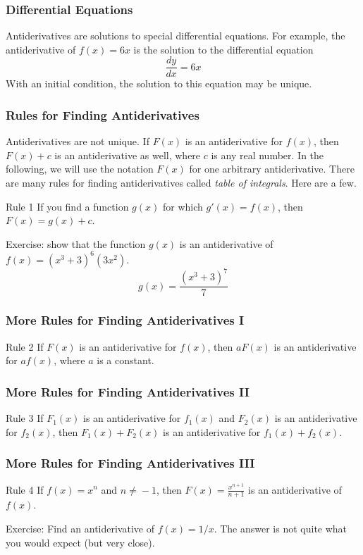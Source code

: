 \documentclass[xcolor=dvipsnames]{beamer}
\begin{document}
\begin{frame}
  \frametitle{Differential Equations}
Antiderivatives are solutions to special differential equations. For
example, the antiderivative of $f(x)=6x$ is the solution to the
differential equation
\begin{equation}
  \label{eq:xoozazui}
  \frac{dy}{dx}=6x
\end{equation}
With an initial condition, the solution to this equation may be
unique.
\end{frame}

\begin{frame}
  \frametitle{Rules for Finding Antiderivatives}
  Antiderivatives are not unique. If $F(x)$ is an antiderivative for
  $f(x)$, then $F(x)+c$ is an antiderivative as well, where $c$ is any
  real number. In the following, we will use the notation $F(x)$ for
  one arbitrary antiderivative. There are many rules for finding
  antiderivatives called \emph{table of integrals}. Here are a few.
  \begin{block}{Rule 1}
    If you find a function $g(x)$ for which $g'(x)=f(x)$, then
    $F(x)=g(x)+c$.
  \end{block}
  Exercise: show that the function $g(x)$ is an antiderivative of
  $f(x)=(x^{3}+3)^{6}(3x^{2})$.
  \begin{equation}
    \label{eq:eiyahcei}
    g(x)=\frac{(x^{3}+3)^{7}}{7}
  \end{equation}
\end{frame}

\begin{frame}
  \frametitle{More Rules for Finding Antiderivatives I}
  \begin{block}{Rule 2}
    If $F(x)$ is an antiderivative for $f(x)$, then $aF(x)$ is an
    antiderivative for $af(x)$, where $a$ is a constant.
  \end{block}
\end{frame}

\begin{frame}
  \frametitle{More Rules for Finding Antiderivatives II}
  \begin{block}{Rule 3}
    If $F_{1}(x)$ is an antiderivative for $f_{1}(x)$ and $F_{2}(x)$
    is an antiderivative for $f_{2}(x)$, then $F_{1}(x)+F_{2}(x)$ is
    an antiderivative for $f_{1}(x)+f_{2}(x)$.
  \end{block}
\end{frame}

\begin{frame}
  \frametitle{More Rules for Finding Antiderivatives III}
  \begin{block}{Rule 4}
    If $f(x)=x^{n}$ and $n\neq{}-1$, then $F(x)=\frac{x^{n+1}}{n+1}$
    is an antiderivative of $f(x)$.
  \end{block}
Exercise: Find an antiderivative of $f(x)=1/x$. The answer is not
quite what you would expect (but very close). 
\end{frame}
\end{document}
